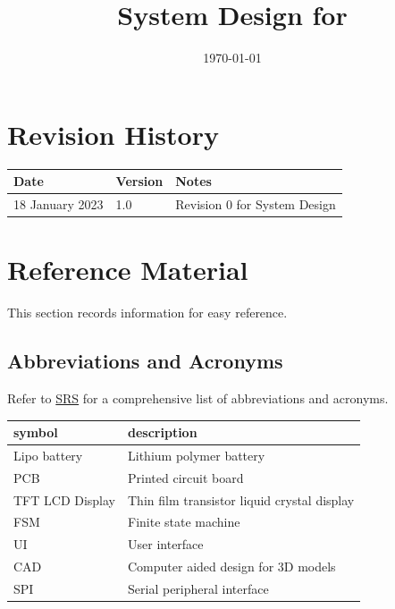 \documentclass[12pt, titlepage]{article}
\begin{document}
\title{System Design for \progname{}} 
\author{\authname}
\date{\today}

\maketitle


\section{Revision History}

\begin{tabularx}{\textwidth}{p{3cm}p{2cm}X}
\toprule {\bf Date} & {\bf Version} & {\bf Notes}\\
\midrule
18 January 2023 & 1.0 & Revision 0 for System Design\\
\bottomrule
\end{tabularx}

\newpage

\section{Reference Material}

This section records information for easy reference.

\subsection{Abbreviations and Acronyms}
Refer to \href{https://github.com/zakerl/Capstone_Project/blob/main/docs/SRS/SRS.pdf}{SRS} for a comprehensive list of abbreviations and acronyms.\\

\renewcommand{\arraystretch}{1.2}
\begin{tabular}{l l} 
  \toprule		
  \textbf{symbol} & \textbf{description}\\
  \midrule 
	Lipo battery & Lithium polymer battery\\
	PCB & Printed circuit board\\
	TFT LCD Display & Thin film transistor liquid crystal display\\
	FSM & Finite state machine\\
	UI & User interface\\
	CAD & Computer aided design for 3D models\\
	SPI & Serial peripheral interface\\

  \bottomrule
\end{tabular}\\
\end{document}
